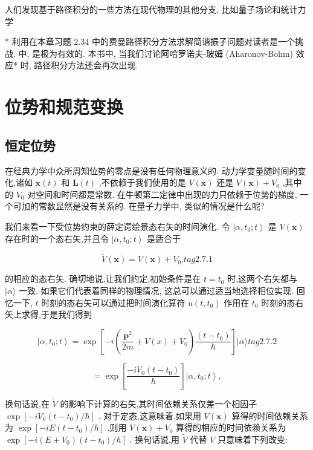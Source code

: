 \documentclass[lang=cn,newtx,10pt,scheme=chinese,thmcnt=section]{elegantbook}
\begin{document}
人们发现基于路径积分的一些方法在现代物理的其他分支, 比如量子场论和统计力学

* 利用在本章习题 2.34 中的费曼路径积分方法求解简谐振子问题对读者是一个挑战. 中, 是极为有效的. 本书中, 当我们讨论阿哈罗诺夫-玻姆 (Aharonov-Bohm) 效应* 时, 路径积分方法还会再次出现.
\section{位势和规范变换}
\subsection*{恒定位势}
在经典力学中众所周知位势的零点是没有任何物理意义的. 动力学变量随时间的变化,诸如 $\mathbf{x}\left( t\right)$ 和 $\mathbf{L}\left( t\right)$ ,不依赖于我们使用的是 $V\left( \mathbf{x}\right)$ 还是 $V\left( \mathbf{x}\right) + {V}_{0}$ ,其中的 ${V}_{0}$ 对空间和时间都是常数. 在牛顿第二定律中出现的力只依赖于位势的梯度, 一个可加的常数显然是没有关系的. 在量子力学中, 类似的情况是什么呢?

我们来看一下受位势约束的薛定谔绘景态右矢的时间演化. 令 $\left| {\alpha ,{t}_{0};t}\right\rangle$ 是 $V\left( \mathbf{x}\right)$ 存在时的一个态右矢,并且令 $\left| {\alpha ,{t}_{0};t}\right\rangle$ 是适合于

$$
\widetilde{V}\left( \mathbf{x}\right) = V\left( \mathbf{x}\right) + {V}_{0}. tag{2.7.1}
$$

的相应的态右矢. 确切地说,让我们约定,初始条件是在 $t = {t}_{0}$ 时,这两个右矢都与 $|\alpha \rangle$ 一致. 如果它们代表着同样的物理情况, 这总可以通过适当地选择相位实现. 回忆一下, $t$ 时刻的态右矢可以通过把时间演化算符 $u\left( {t,{t}_{0}}\right)$ 作用在 ${t}_{0}$ 时刻的态右矢上求得,于是我们得到

$$
\left| {\alpha ,{t}_{0};t}\right\rangle = \exp \left\lbrack {-i\left( {\frac{{\mathbf{p}}^{2}}{2m} + V\left( x\right) + {V}_{0}}\right) \frac{\left( t - {t}_{0}\right) }{\hbar }}\right\rbrack |\alpha \rangle tag{2.7.2}
$$

$$
= \exp \left\lbrack \frac{-i{V}_{0}\left( {t - {t}_{0}}\right) }{\hbar }\right\rbrack \left| {\alpha ,{t}_{0};t}\right\rangle ,
$$

换句话说,在 $\widetilde{V}$ 的影响下计算的右矢,其时间依赖关系仅差一个相因子 $\exp \left\lbrack {-i{V}_{0}\left( {t - {t}_{0}}\right) /\hbar }\right\rbrack$ . 对于定态,这意味着,如果用 $V\left( \mathbf{x}\right)$ 算得的时间依赖关系为 $\exp \left\lbrack {-{iE}\left( {t - {t}_{0}}\right) /\hbar }\right\rbrack$ ,则用 $V\left( \mathbf{x}\right) + {V}_{0}$ 算得的相应的时间依赖关系为 $\exp \left\lbrack {-i\left( {E + {V}_{0}}\right) \left( {t - {t}_{0}}\right) /\hbar }\right\rbrack$ . 换句话说,用 $\widetilde{V}$ 代替 $V$ 只意味着下列改变:
\end{document}
